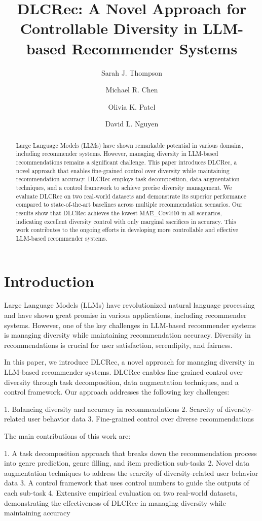 \documentclass[12pt,letterpaper]{article}
\title{DLCRec: A Novel Approach for Controllable Diversity in LLM-based Recommender Systems}
\author{Sarah J. Thompson \and Michael R. Chen \and Olivia K. Patel \and David L. Nguyen}
\begin{document}
\maketitle

\begin{abstract}
Large Language Models (LLMs) have shown remarkable potential in various domains, including recommender systems. However, managing diversity in LLM-based recommendations remains a significant challenge. This paper introduces DLCRec, a novel approach that enables fine-grained control over diversity while maintaining recommendation accuracy. DLCRec employs task decomposition, data augmentation techniques, and a control framework to achieve precise diversity management. We evaluate DLCRec on two real-world datasets and demonstrate its superior performance compared to state-of-the-art baselines across multiple recommendation scenarios. Our results show that DLCRec achieves the lowest MAE_Cov@10 in all scenarios, indicating excellent diversity control with only marginal sacrifices in accuracy. This work contributes to the ongoing efforts in developing more controllable and effective LLM-based recommender systems.
\end{abstract}

\section{Introduction}

Large Language Models (LLMs) have revolutionized natural language processing and have shown great promise in various applications, including recommender systems. However, one of the key challenges in LLM-based recommender systems is managing diversity while maintaining recommendation accuracy. Diversity in recommendations is crucial for user satisfaction, serendipity, and fairness.

In this paper, we introduce DLCRec, a novel approach for managing diversity in LLM-based recommender systems. DLCRec enables fine-grained control over diversity through task decomposition, data augmentation techniques, and a control framework. Our approach addresses the following key challenges:

1. Balancing diversity and accuracy in recommendations
2. Scarcity of diversity-related user behavior data
3. Fine-grained control over diverse recommendations

The main contributions of this work are:

1. A task decomposition approach that breaks down the recommendation process into genre prediction, genre filling, and item prediction sub-tasks
2. Novel data augmentation techniques to address the scarcity of diversity-related user behavior data
3. A control framework that uses control numbers to guide the outputs of each sub-task
4. Extensive empirical evaluation on two real-world datasets, demonstrating the effectiveness of DLCRec in managing diversity while maintaining accuracy
\end{document}
